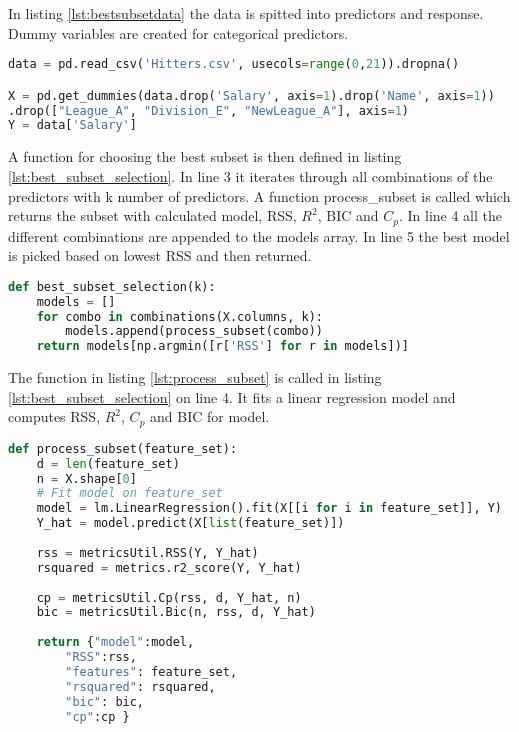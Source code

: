 In listing \ref{lst:bestsubsetdata} the data is spitted into predictors and response. Dummy variables are created for categorical predictors.

\begin{lstlisting}[language=Python, label=lst:bestsubsetdata, caption=Data is split into predictors and response]
data = pd.read_csv('Hitters.csv', usecols=range(0,21)).dropna()

X = pd.get_dummies(data.drop('Salary', axis=1).drop('Name', axis=1))
.drop(["League_A", "Division_E", "NewLeague_A"], axis=1)
Y = data['Salary']
\end{lstlisting}


A function for choosing the best subset is then defined in listing \ref{lst:best_subset_selection}. In line 3 it iterates through all combinations of the predictors with k number of predictors. A function process\_subset is called which returns the subset with calculated model, RSS, $R^2$, BIC and $C_p$. In line 4 all the different combinations are appended to the models array. In line 5 the best model is picked based on lowest RSS and then returned.

\begin{lstlisting}[language=Python, label=lst:best_subset_selection, caption=Function for choosing best subset]
def best_subset_selection(k):
	models = []
	for combo in combinations(X.columns, k):
		models.append(process_subset(combo))
	return models[np.argmin([r['RSS'] for r in models])]
\end{lstlisting}

The function in listing \ref{lst:process_subset} is called in listing \ref{lst:best_subset_selection} on line 4. It fits a linear regression model and computes RSS, $R^2$, $C_p$ and BIC for model.

\begin{lstlisting}[language=Python, label=lst:process_subset, caption=Function for computing metrics for subset]
def process_subset(feature_set):
	d = len(feature_set)
	n = X.shape[0]
	# Fit model on feature_set  
	model = lm.LinearRegression().fit(X[[i for i in feature_set]], Y)
	Y_hat = model.predict(X[list(feature_set)])
	
	rss = metricsUtil.RSS(Y, Y_hat)  
	rsquared = metrics.r2_score(Y, Y_hat)
	
	cp = metricsUtil.Cp(rss, d, Y_hat, n)
	bic = metricsUtil.Bic(n, rss, d, Y_hat)
	
	return {"model":model, 
		"RSS":rss,
		"features": feature_set,
		"rsquared": rsquared,
		"bic": bic,
		"cp":cp }
\end{lstlisting}

